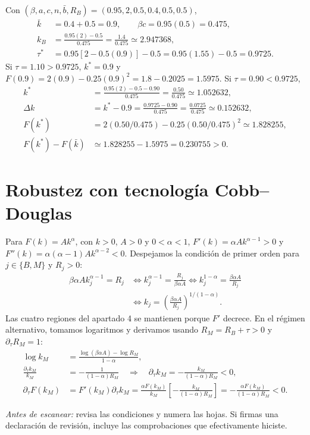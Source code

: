 \documentclass[11pt]{article}
\newcommand{\Rb}{R_B}
\newcommand{\kb}{k_B}
\newcommand{\km}{k_M}
\begin{document}
Con $(\beta,a,c,n,\bar b,\Rb)=(0.95,2,0.5,0.4,0.5,0.5)$,
\begin{align*}
\bar k&=0.4+0.5=0.9,\qquad \beta c=0.95(0.5)=0.475,\\
\kb&=\frac{0.95(2)-0.5}{0.475}=\frac{1.4}{0.475}\simeq2.947368,\\
\tau^*&=0.95[2-0.5(0.9)]-0.5=0.95(1.55)-0.5=0.9725.
\end{align*}
Si $\tau=1.10>0.9725$, $k^*=0.9$ y
$F(0.9)=2(0.9)-0.25(0.9)^2=1.8-0.2025=1.5975$.
Si $\tau=0.90<0.9725$,
\begin{align*}
k^*&=\frac{0.95(2)-0.5-0.90}{0.475}
=\frac{0.50}{0.475}\simeq1.052632,\\
\Delta k&=k^*-0.9=\frac{0.9725-0.90}{0.475}
=\frac{0.0725}{0.475}\simeq0.152632,\\
F(k^*)&=2(0.50/0.475)-0.25(0.50/0.475)^2\simeq1.828255,\\
F(k^*)-F(\bar k)&\simeq1.828255-1.5975=0.230755>0.
\end{align*}

\section{Robustez con tecnología Cobb--Douglas}

Para $F(k)=Ak^\alpha$, con $k>0$, $A>0$ y $0<\alpha<1$,
$F'(k)=\alpha Ak^{\alpha-1}>0$ y
$F''(k)=\alpha(\alpha-1)Ak^{\alpha-2}<0$. Despejamos la condición de
primer orden para $j\in\{B,M\}$ y $R_j>0$:
\begin{align*}
\beta\alpha A k_j^{\alpha-1}=R_j
&\iff k_j^{\alpha-1}=\frac{R_j}{\beta\alpha A}
\iff k_j^{1-\alpha}=\frac{\beta\alpha A}{R_j}\\
&\iff k_j=\left(\frac{\beta\alpha A}{R_j}\right)^{1/(1-\alpha)}.
\end{align*}
Las cuatro regiones del apartado 4 se mantienen porque $F'$ decrece.
En el régimen alternativo, tomamos logaritmos y derivamos usando
$R_M=\Rb+\tau>0$ y $\partial_\tau R_M=1$:
\begin{align*}
\log\km&=\frac{\log(\beta\alpha A)-\log R_M}{1-\alpha},\\
\frac{\partial_\tau\km}{\km}&=-\frac{1}{(1-\alpha)R_M}
\quad\Rightarrow\quad
\partial_\tau\km=-\frac{\km}{(1-\alpha)R_M}<0,\\
\partial_\tau F(\km)&=F'(\km)\partial_\tau\km
=\frac{\alpha F(\km)}{\km}\left[-\frac{\km}{(1-\alpha)R_M}\right]
=-\frac{\alpha F(\km)}{(1-\alpha)R_M}<0.
\end{align*}

\medskip
\noindent\textit{Antes de escanear:} revisa las condiciones y numera
las hojas. Si firmas una declaración de revisión, incluye las comprobaciones
que efectivamente hiciste.
\end{document}
